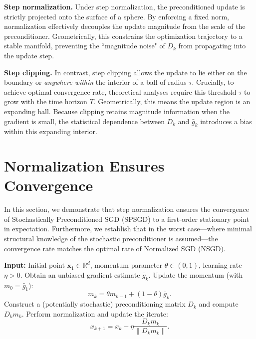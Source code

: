 \documentclass{article}
\newcommand{\bx}{\boldsymbol{x}}
\newcommand{\barg}{\bar{g}}
\theoremstyle{plain}
\theoremstyle{definition}
\theoremstyle{remark}
\begin{document}
\textbf{Step normalization.}
Under step normalization, the preconditioned update is strictly projected onto the surface of a sphere. By enforcing a fixed norm, normalization effectively decouples the update magnitude from the scale of the preconditioner. Geometrically, this constrains the optimization trajectory to a stable manifold, preventing the ``magnitude noise" of $D_k$ from propagating into the update step. 

\textbf{Step clipping.}
In contrast, step clipping allows the update to lie either on the boundary or \emph{anywhere within} the interior of a ball of radius $\tau$. Crucially, to achieve optimal convergence rate, theoretical analyses require this threshold $\tau$ to grow with the time horizon $T$. Geometrically, this means the update region is an expanding ball. Because clipping retains magnitude information when the gradient is small, the statistical dependence between $D_k$ and $\barg_k$ introduces a bias within this expanding interior. 





\section{Normalization Ensures Convergence}\label{sec3}

In this section, we demonstrate that step normalization ensures the convergence of Stochastically Preconditioned SGD (SPSGD) to a first-order stationary point in expectation. Furthermore, we establish that in the worst case—where minimal structural knowledge of the stochastic preconditioner is assumed—the convergence rate matches the optimal rate of Normalized SGD (NSGD). 

\begin{algorithm}[t]
\caption{SPSGD with Step Normalization}
\label{alg:nsgdm}
\begin{algorithmic}[1]
\STATE \textbf{Input:} Initial point $\bx_1 \in \mathbb{R}^d$, momentum parameter $\theta \in (0,1)$, learning rate $\eta > 0$.
    \STATE Obtain an unbiased gradient estimate $\barg_k$.
    \STATE Update the momentum (with $m_0=\barg_1$):
    \begin{equation*}
        m_k = \theta m_{k-1} + (1 - \theta) \barg_k.
    \end{equation*}
    \STATE Construct a (potentially stochastic) preconditioning matrix $D_k$ and compute $D_km_k$.
    \STATE Perform normalization and update the iterate:
    \begin{equation*}
        x_{k+1} = x_k - \eta \frac{D_km_k}{\|D_km_k\|}.
    \end{equation*}
    \ENDFOR
\end{algorithmic}
\end{algorithm}
\end{document}
